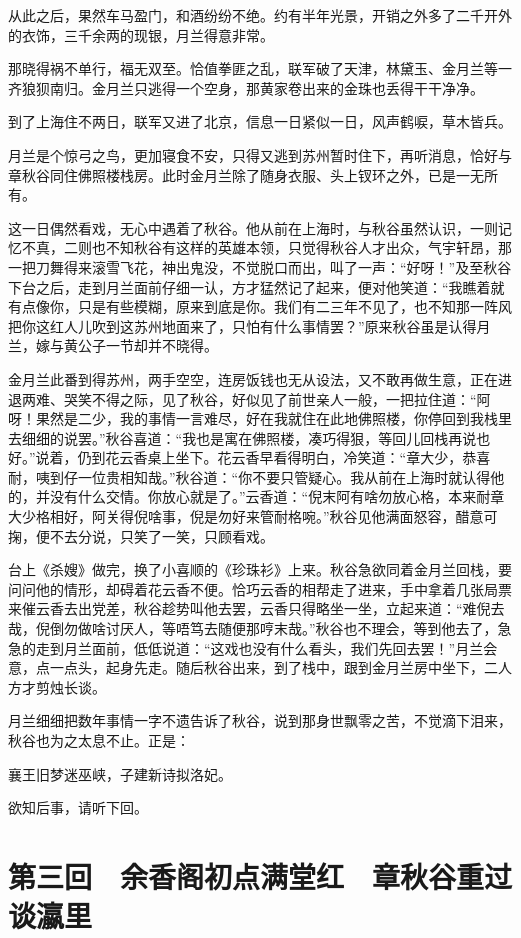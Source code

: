 \documentclass[12pt,UTF8]{ctexbook}
\begin{document}
从此之后，果然车马盈门，和酒纷纷不绝。约有半年光景，开销之外多了二千开外的衣饰，三千余两的现银，月兰得意非常。

那晓得祸不单行，福无双至。恰值拳匪之乱，联军破了天津，林黛玉、金月兰等一齐狼狈南归。金月兰只逃得一个空身，那黄家卷出来的金珠也丢得干干净净。

到了上海住不两日，联军又进了北京，信息一日紧似一日，风声鹤唳，草木皆兵。

月兰是个惊弓之鸟，更加寝食不安，只得又逃到苏州暂时住下，再听消息，恰好与章秋谷同住佛照楼栈房。此时金月兰除了随身衣服、头上钗环之外，已是一无所有。

这一日偶然看戏，无心中遇着了秋谷。他从前在上海时，与秋谷虽然认识，一则记忆不真，二则也不知秋谷有这样的英雄本领，只觉得秋谷人才出众，气宇轩昂，那一把刀舞得来滚雪飞花，神出鬼没，不觉脱口而出，叫了一声：“好呀！”及至秋谷下台之后，走到月兰面前仔细一认，方才猛然记了起来，便对他笑道：“我瞧着就有点像你，只是有些模糊，原来到底是你。我们有二三年不见了，也不知那一阵风把你这红人儿吹到这苏州地面来了，只怕有什么事情罢？”原来秋谷虽是认得月兰，嫁与黄公子一节却并不晓得。

金月兰此番到得苏州，两手空空，连房饭钱也无从设法，又不敢再做生意，正在进退两难、哭笑不得之际，见了秋谷，好似见了前世亲人一般，一把拉住道：“阿呀！果然是二少，我的事情一言难尽，好在我就住在此地佛照楼，你停回到我栈里去细细的说罢。”秋谷喜道：“我也是寓在佛照楼，凑巧得狠，等回儿回栈再说也好。”说着，仍到花云香桌上坐下。花云香早看得明白，冷笑道：“章大少，恭喜耐，咦到仔一位贵相知哉。”秋谷道：“你不要只管疑心。我从前在上海时就认得他的，并没有什么交情。你放心就是了。”云香道：“倪末阿有啥勿放心格，本来耐章大少格相好，阿关得倪啥事，倪是勿好来管耐格啘。”秋谷见他满面怒容，醋意可掬，便不去分说，只笑了一笑，只顾看戏。

台上《杀嫂》做完，换了小喜顺的《珍珠衫》上来。秋谷急欲同着金月兰回栈，要问问他的情形，却碍着花云香不便。恰巧云香的相帮走了进来，手中拿着几张局票来催云香去出党差，秋谷趁势叫他去罢，云香只得略坐一坐，立起来道：“难倪去哉，倪倒勿做啥讨厌人，等唔笃去随便那哼末哉。”秋谷也不理会，等到他去了，急急的走到月兰面前，低低说道：“这戏也没有什么看头，我们先回去罢！”月兰会意，点一点头，起身先走。随后秋谷出来，到了栈中，跟到金月兰房中坐下，二人方才剪烛长谈。

月兰细细把数年事情一字不遗告诉了秋谷，说到那身世飘零之苦，不觉滴下泪来，秋谷也为之太息不止。正是：

襄王旧梦迷巫峡，子建新诗拟洛妃。

欲知后事，请听下回。

\chapter{第三回　余香阁初点满堂红　章秋谷重过谈瀛里}
\end{document}
